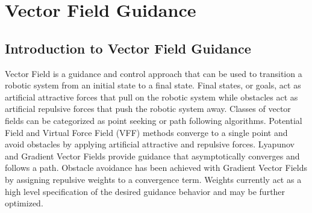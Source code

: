 \documentclass[numbered,pdftex]{ohio-etd}
\begin{document}
%
%
%


\section{Vector Field Guidance}
\subsection{Introduction to Vector Field Guidance}
 Vector Field is a guidance and control approach that can be used to transition a robotic system from an initial state to a final state. Final states, or goals, act as artificial attractive forces that pull on the robotic system while obstacles act as artificial repulsive forces that push the robotic system away. Classes of vector fields can be categorized as point seeking or path following algorithms. Potential Field and Virtual Force Field (VFF) methods converge to a single point and avoid obstacles by applying artificial attractive and repulsive forces. Lyapunov and Gradient Vector Fields provide guidance that asymptotically converges and follows a path. Obstacle avoidance has been achieved with Gradient Vector Fields by assigning repulsive weights to a convergence term. Weights currently act as a high level specification of the desired guidance behavior and may be further optimized. 
\end{document}
